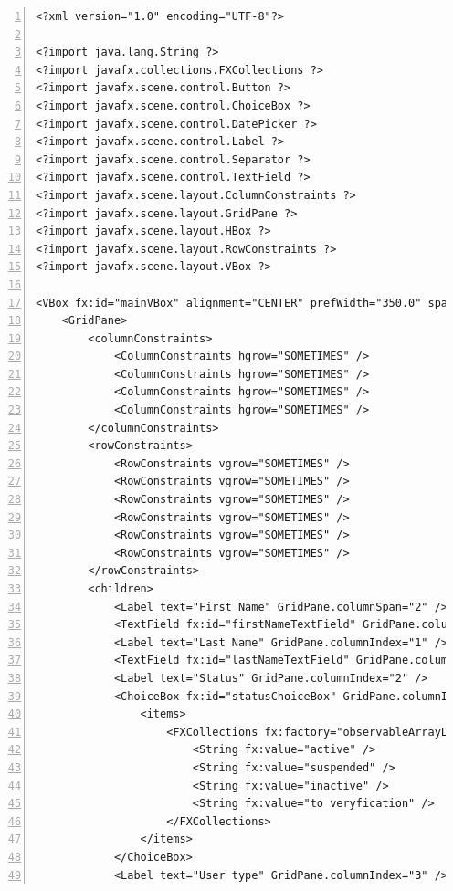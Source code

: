 \begin{lstlisting}[breaklines=true, numbers=left, stepnumber=1, label={lst:GUIuserDetailsForm}, caption={Account personal data form}]
<?xml version="1.0" encoding="UTF-8"?>

<?import java.lang.String ?>
<?import javafx.collections.FXCollections ?>
<?import javafx.scene.control.Button ?>
<?import javafx.scene.control.ChoiceBox ?>
<?import javafx.scene.control.DatePicker ?>
<?import javafx.scene.control.Label ?>
<?import javafx.scene.control.Separator ?>
<?import javafx.scene.control.TextField ?>
<?import javafx.scene.layout.ColumnConstraints ?>
<?import javafx.scene.layout.GridPane ?>
<?import javafx.scene.layout.HBox ?>
<?import javafx.scene.layout.RowConstraints ?>
<?import javafx.scene.layout.VBox ?>

<VBox fx:id="mainVBox" alignment="CENTER" prefWidth="350.0" spacing="10" xmlns="http://javafx.com/javafx/8.0.171" xmlns:fx="http://javafx.com/fxml/1" fx:controller="io.swagger.app.controller.UserDetailsFormController">
    <GridPane>
        <columnConstraints>
            <ColumnConstraints hgrow="SOMETIMES" />
            <ColumnConstraints hgrow="SOMETIMES" />
            <ColumnConstraints hgrow="SOMETIMES" />
            <ColumnConstraints hgrow="SOMETIMES" />
        </columnConstraints>
        <rowConstraints>
            <RowConstraints vgrow="SOMETIMES" />
            <RowConstraints vgrow="SOMETIMES" />
            <RowConstraints vgrow="SOMETIMES" />
            <RowConstraints vgrow="SOMETIMES" />
            <RowConstraints vgrow="SOMETIMES" />
            <RowConstraints vgrow="SOMETIMES" />
        </rowConstraints>
        <children>
            <Label text="First Name" GridPane.columnSpan="2" />
            <TextField fx:id="firstNameTextField" GridPane.columnIndex="0" GridPane.rowIndex="1" />
            <Label text="Last Name" GridPane.columnIndex="1" />
            <TextField fx:id="lastNameTextField" GridPane.columnIndex="1" GridPane.rowIndex="1" />
            <Label text="Status" GridPane.columnIndex="2" />
            <ChoiceBox fx:id="statusChoiceBox" GridPane.columnIndex="2" GridPane.rowIndex="1">
                <items>
                    <FXCollections fx:factory="observableArrayList">
                        <String fx:value="active" />
                        <String fx:value="suspended" />
                        <String fx:value="inactive" />
                        <String fx:value="to veryfication" />
                    </FXCollections>
                </items>
            </ChoiceBox>
            <Label text="User type" GridPane.columnIndex="3" />

\end{lstlisting}
